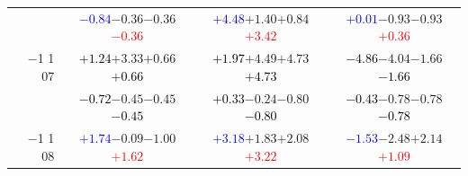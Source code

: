 \documentclass[compress]{beamer}
\begin{document}
\begin{frame}
\begin{tabular}{r | c | c | c}
          & \textcolor{blue}{$-0.84$}\hspace{0.1 cm}$-0.36$\hspace{0.1 cm}$-0.36$\hspace{0.1 cm}\textcolor{red}{$-0.36$} & \textcolor{blue}{$+4.48$}\hspace{0.1 cm}$+1.40$\hspace{0.1 cm}$+0.84$\hspace{0.1 cm}\textcolor{red}{$+3.42$} & \textcolor{blue}{$+0.01$}\hspace{0.1 cm}$-0.93$\hspace{0.1 cm}$-0.93$\hspace{0.1 cm}\textcolor{red}{$+0.36$} \\
$-$1 1 07 & \textcolor{black}{$+1.24$}\hspace{0.1 cm}$+3.33$\hspace{0.1 cm}$+0.66$\hspace{0.1 cm}\textcolor{black}{$+0.66$} & \textcolor{black}{$+1.97$}\hspace{0.1 cm}$+4.49$\hspace{0.1 cm}$+4.73$\hspace{0.1 cm}\textcolor{black}{$+4.73$} & \textcolor{black}{$-4.86$}\hspace{0.1 cm}$-4.04$\hspace{0.1 cm}$-1.66$\hspace{0.1 cm}\textcolor{black}{$-1.66$} \\
          & \textcolor{black}{$-0.72$}\hspace{0.1 cm}$-0.45$\hspace{0.1 cm}$-0.45$\hspace{0.1 cm}\textcolor{black}{$-0.45$} & \textcolor{black}{$+0.33$}\hspace{0.1 cm}$-0.24$\hspace{0.1 cm}$-0.80$\hspace{0.1 cm}\textcolor{black}{$-0.80$} & \textcolor{black}{$-0.43$}\hspace{0.1 cm}$-0.78$\hspace{0.1 cm}$-0.78$\hspace{0.1 cm}\textcolor{black}{$-0.78$} \\
$-$1 1 08 & \textcolor{blue}{$+1.74$}\hspace{0.1 cm}$-0.09$\hspace{0.1 cm}$-1.00$\hspace{0.1 cm}\textcolor{red}{$+1.62$} & \textcolor{blue}{$+3.18$}\hspace{0.1 cm}$+1.83$\hspace{0.1 cm}$+2.08$\hspace{0.1 cm}\textcolor{red}{$+3.22$} & \textcolor{blue}{$-1.53$}\hspace{0.1 cm}$-2.48$\hspace{0.1 cm}$+2.14$\hspace{0.1 cm}\textcolor{red}{$+1.09$} \\

\end{tabular}
\end{frame}
\end{document}
